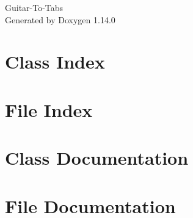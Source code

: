 \documentclass[twoside]{book}
\newcommand{\+}{\discretionary{\mbox{\scriptsize$\hookleftarrow$}}{}{}}
\newcommand{\clearemptydoublepage}{%
    \newpage{\pagestyle{empty}\cleardoublepage}%
  }
\begin{document}
  \raggedbottom
    \hypersetup{pageanchor=false,
                bookmarksnumbered=true,
                pdfencoding=unicode
               }
  \begin{titlepage}
  \vspace*{7cm}
  \begin{center}%
  {\Large Guitar-\/\+To-\/\+Tabs}\\
  \vspace*{1cm}
  {\large Generated by Doxygen 1.14.0}\\
  \end{center}
  \end{titlepage}
  \clearemptydoublepage
  \tableofcontents
  \clearemptydoublepage
  \hypersetup{pageanchor=true}
\chapter{Class Index}

\chapter{File Index}

\chapter{Class Documentation}










\chapter{File Documentation}



















  \backmatter
  \newpage
  \clearemptydoublepage
  \printindex
\end{document}
